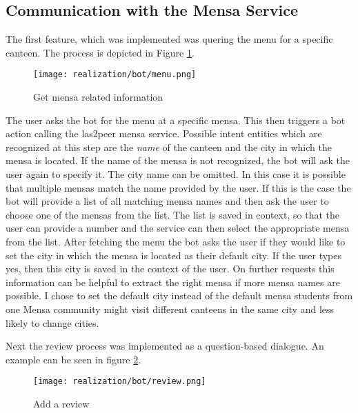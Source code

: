 \subsection{Communication with the Mensa Service}
The first feature, which was implemented was quering the menu for a specific canteen. 
The process is depicted in Figure \ref{fig:getMenu}.
\begin{figure}[h]
    \centering
    \texttt{[image: realization/bot/menu.png]}
    \caption{Get mensa related information}
    \label{fig:getMenu}
\end{figure}
The user asks the bot for the menu at a specific mensa. 
This then triggers a bot action calling the las2peer mensa service. 
Possible intent entities which are recognized at this step are the \emph{name} of the canteen and the city in which the mensa is located.
If the name of the mensa is not recognized, the bot will ask  the user again to specify it. The city name can be omitted. In this case it is possible that multiple mensas match the name provided by the user. If this is the case the bot will provide a list of all matching mensa names and then ask the user to choose one of the mensas from the list. The list is saved in context, so that the user can provide a number and the service can then select the appropriate mensa from the list.
After fetching the menu the bot asks the user if they would like to set the city in which the mensa is located as their default city. If the user types yes, then this city is saved in the context of the user. On further requests this information can be helpful to extract the right mensa if more mensa names are possible. 
I chose to set the default city instead of the default mensa students from one Mensa community might visit different canteens in the same city and less likely to change cities. 

Next the review process was implemented as a question-based dialogue. An example can be seen in figure \ref{fig:addReview}.

\begin{figure}[h]
    \centering
    \texttt{[image: realization/bot/review.png]}
    \caption{Add a review}
    \label{fig:addReview}
\end{figure}

